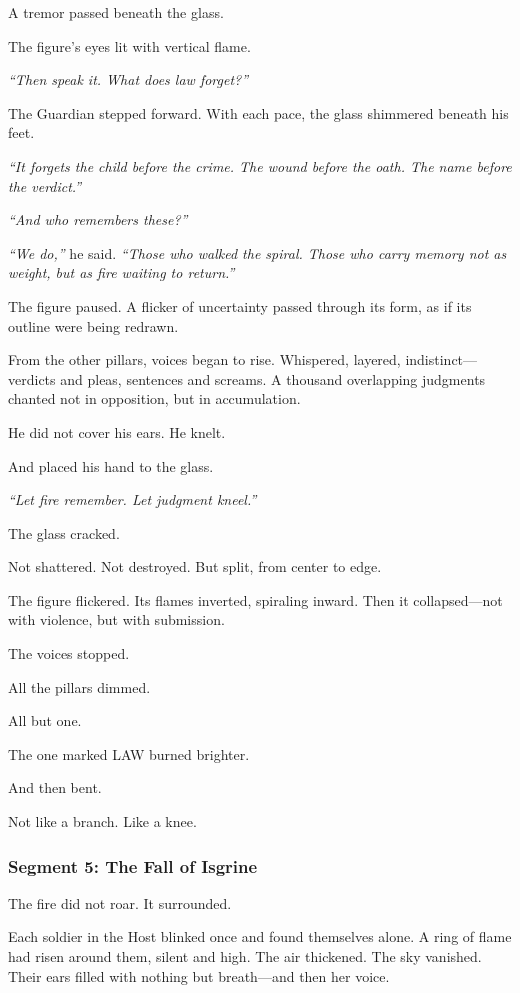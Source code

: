 \documentclass[9pt]{article}
\begin{document}
A tremor passed beneath the glass.

The figure's eyes lit with vertical flame.

\textit{``Then speak it. What does law forget?''}

The Guardian stepped forward. With each pace, the glass shimmered beneath his feet.

\textit{``It forgets the child before the crime. The wound before the oath. The name before the verdict.''}

\textit{``And who remembers these?''}

\textit{``We do,''} he said. \textit{``Those who walked the spiral. Those who carry memory not as weight, but as fire waiting to return.''}

The figure paused. A flicker of uncertainty passed through its form, as if its outline were being redrawn.

From the other pillars, voices began to rise. Whispered, layered, indistinct—verdicts and pleas, sentences and screams. A thousand overlapping judgments chanted not in opposition, but in accumulation.

He did not cover his ears. He knelt.

And placed his hand to the glass.

\textit{``Let fire remember. Let judgment kneel.''}

The glass cracked.

Not shattered. Not destroyed. But split, from center to edge.

The figure flickered. Its flames inverted, spiraling inward. Then it collapsed—not with violence, but with submission.

The voices stopped.

All the pillars dimmed.

All but one.

The one marked \textsc{LAW} burned brighter.

And then bent.

Not like a branch. Like a knee.


\newpage

\subsubsection*{Segment 5: The Fall of Isgrine}

The fire did not roar. It surrounded.

Each soldier in the Host blinked once and found themselves alone. A ring of flame had risen around them, silent and high. The air thickened. The sky vanished. Their ears filled with nothing but breath—and then her voice.
\end{document}

